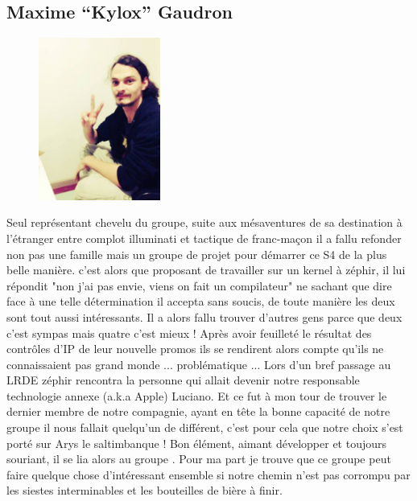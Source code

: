 \subsection{Maxime ``Kylox'' Gaudron}
    \begin{figure}
        \vspace{-7mm}
        \includegraphics[width=4cm]{img/max.jpg}
    \end{figure}
  Seul représentant chevelu du groupe, suite aux mésaventures de sa destination
  à l'étranger entre complot illuminati et tactique de franc-maçon il a fallu 
  refonder non pas une famille mais un groupe de projet pour démarrer ce S4 de
  la plus belle manière. c'est alors que proposant de travailler sur un kernel 
  à zéphir, il lui répondit "non j'ai pas envie, viens on fait un compilateur" 
  ne sachant que dire face à une telle détermination il accepta sans soucis, de 
  toute manière les deux sont tout aussi intéressants.
Il a alors fallu trouver d'autres gens parce que deux c'est sympas mais quatre 
c'est mieux ! Après avoir feuilleté le résultat des contrôles d'IP de leur 
nouvelle promos ils se rendirent alors compte qu'ils ne connaissaient pas grand
monde ... problématique ... Lors d'un bref passage au LRDE zéphir rencontra la 
personne qui allait devenir notre responsable technologie annexe (a.k.a Apple) 
Luciano. Et ce fut à mon tour de trouver le dernier membre de notre compagnie, 
ayant en tête la bonne capacité de notre groupe il nous fallait quelqu'un de 
différent, c'est pour cela que notre choix s'est porté sur Arys le saltimbanque
! Bon élément, aimant développer et toujours souriant, il se lia alors au groupe
. Pour ma part je trouve que ce groupe peut faire quelque chose d'intéressant 
ensemble si notre chemin n'est pas corrompu par les siestes interminables et 
les bouteilles de bière à finir.
